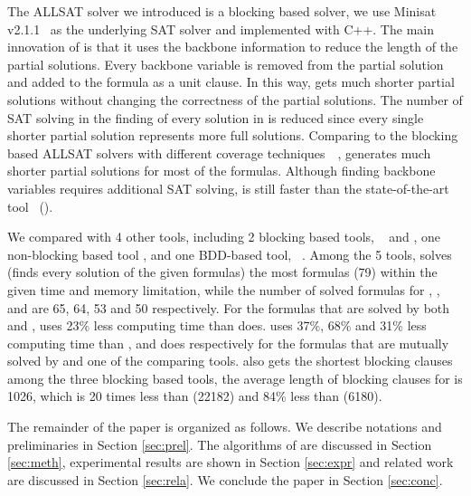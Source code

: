 The ALLSAT solver \tool we introduced is a blocking based solver, we use Minisat v2.1.1~\cite{minisat} as the underlying SAT solver and implemented \tool with C++. The main innovation of \tool is that it uses the backbone information to reduce the length of the partial solutions. Every backbone variable is removed from the partial solution and added to the formula as a unit clause. In this way, \tool gets much shorter partial solutions without changing the correctness of the partial solutions. 
The number of SAT solving in the finding of every solution in \tool is reduced since every single shorter partial solution represents more full solutions. Comparing to the blocking based ALLSAT solvers with different coverage techniques~\cite{jin2005efficient}~\cite{morgado2005good}, \tool generates much shorter partial solutions for most of the formulas. Although finding backbone variables requires additional SAT solving, \tool is still faster than the state-of-the-art tool~\cite{ctool} (\ctool).

We compared \tool with 4 other tools, including 2 blocking based tools, \ctool~\cite{ctool} and \bc, one non-blocking based tool , \nbc and one BDD-based tool, \bdd~\cite{ietool}. Among the 5 tools, \tool solves (finds every solution of the given formulas) the most formulas (79) within the given time and memory limitation, while the number of solved formulas for \ctool, \bc, \nbc and \bdd  are 65, 64, 53 and 50 respectively. 
For the formulas that are solved by both \tool and \ctool, \tool uses 23\% less computing time than \ctool does.
\tool uses 37\%, 68\% and 31\% less computing time than \bc, \nbc and \bdd does respectively for the formulas that are mutually solved by \tool and one of the comparing tools.
\tool also gets the shortest blocking clauses among the three blocking based tools, the average length of blocking clauses for \tool is 1026, which is 20 times less than \ctool (22182) and 84\% less than \bc (6180). 

The remainder of the paper is organized as follows. We describe notations and preliminaries in Section \ref{sec:prel}. The algorithms of \tool are discussed in Section \ref{sec:meth}, experimental results are shown in Section \ref{sec:expr} and related work are discussed in Section \ref{sec:rela}. We conclude the paper in Section \ref{sec:conc}.

